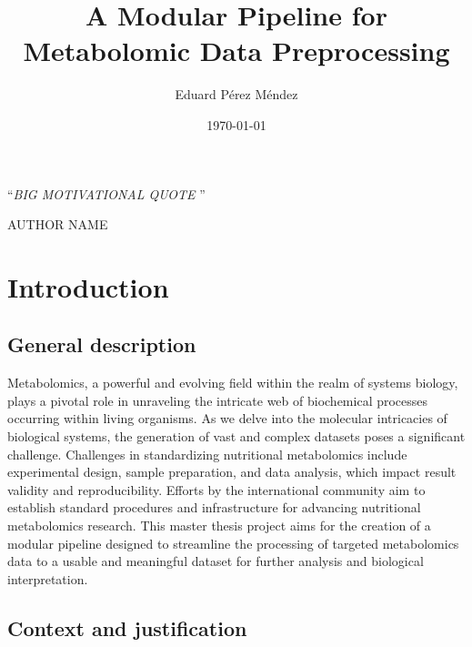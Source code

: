 \documentclass[ENG, BIB]{TFUOC}%
\title{A Modular Pipeline for Metabolomic Data Preprocessing}
\author{Eduard Pérez Méndez}
\date{\today}
\begin{document}
\estructura

\newpage\null\thispagestyle{empty}

\vspace*{0.4\textheight} 

\noindent\enquote{\itshape BIG MOTIVATIONAL QUOTE
}\bigbreak 

\hfill AUTHOR NAME

\newpage


\tableofcontents

\listoffigures

\listoftables



\chapter{Introduction}

\section{General description}

Metabolomics, a powerful and evolving field within the realm of systems biology, plays a pivotal role in unraveling the intricate web of biochemical processes occurring within living organisms. As we delve into the molecular intricacies of biological systems, the generation of vast and complex datasets poses a significant challenge. Challenges in standardizing nutritional metabolomics include experimental design, sample preparation, and data analysis, which impact result validity and reproducibility. Efforts by the international community aim to establish standard procedures and infrastructure for advancing nutritional metabolomics research. This master thesis project aims for the creation of a modular pipeline designed to streamline the processing of targeted metabolomics data to a usable and meaningful dataset for further analysis and biological interpretation.

\section{Context and justification}
\end{document}
